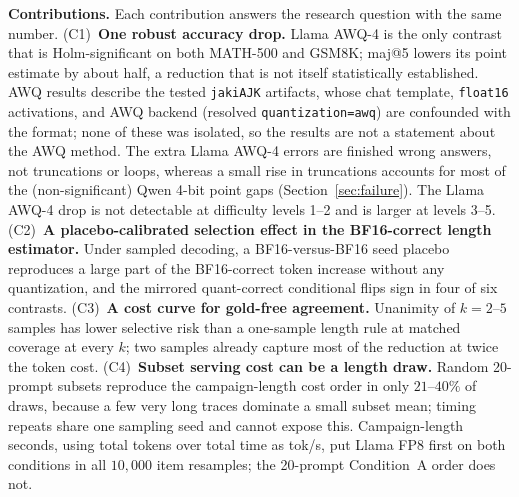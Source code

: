 \documentclass[11pt,a4paper]{article}
\begin{document}
\noindent\textbf{Contributions.} Each contribution answers the research question with the same number.
(C1)~\textbf{One robust accuracy drop.} Llama AWQ-4 is the only contrast that is Holm-significant on both MATH-500 and GSM8K; maj@5 lowers its point estimate by about half, a reduction that is not itself statistically established. AWQ results describe the tested \texttt{jakiAJK} artifacts, whose chat template, \texttt{float16} activations, and AWQ backend (resolved \texttt{quantization=awq}) are confounded with the format; none of these was isolated, so the results are not a statement about the AWQ method. The extra Llama AWQ-4 errors are finished wrong answers, not truncations or loops, whereas a small rise in truncations accounts for most of the (non-significant) Qwen 4-bit point gaps (Section~\ref{sec:failure}). The Llama AWQ-4 drop is not detectable at difficulty levels 1--2 and is larger at levels 3--5.
(C2)~\textbf{A placebo-calibrated selection effect in the BF16-correct length estimator.} Under sampled decoding, a BF16-versus-BF16 seed placebo reproduces a large part of the BF16-correct token increase without any quantization, and the mirrored quant-correct conditional flips sign in four of six contrasts.
(C3)~\textbf{A cost curve for gold-free agreement.} Unanimity of $k=2$--$5$ samples has lower selective risk than a one-sample length rule at matched coverage at every $k$; two samples already capture most of the reduction at twice the token cost.
(C4)~\textbf{Subset serving cost can be a length draw.} Random 20-prompt subsets reproduce the campaign-length cost order in only $21$--$40\%$ of draws, because a few very long traces dominate a small subset mean; timing repeats share one sampling seed and cannot expose this. Campaign-length seconds, using total tokens over total time as tok/s, put Llama FP8 first on both conditions in all $10{,}000$ item resamples; the 20-prompt Condition~A order does not.
\end{document}
